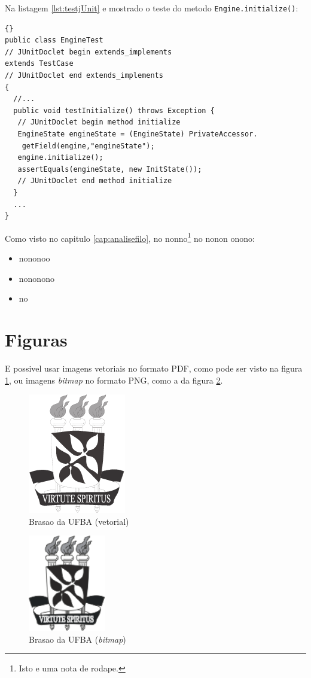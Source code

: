 Na listagem \ref{lst:testjUnit} 
e mostrado o teste do metodo \texttt{Engine.initialize()}:

\lstset{language=java}
\lstset{commentstyle=\textit}
\begin{lstlisting}[frame=trbl, caption=Classe Factory2D,label=lst:testjUnit]{}
public class EngineTest
// JUnitDoclet begin extends_implements
extends TestCase
// JUnitDoclet end extends_implements
{
  //...
  public void testInitialize() throws Exception {
   // JUnitDoclet begin method initialize
   EngineState engineState = (EngineState) PrivateAccessor.
    getField(engine,"engineState");
   engine.initialize();
   assertEquals(engineState, new InitState());
   // JUnitDoclet end method initialize
  }
  ...
}
\end{lstlisting}

Como visto no capitulo \ref{cap:analisefilo}, no nonno\footnote{Isto e uma nota
de rodape.} no nonon onono:
\begin{itemize}
  \item{nononoo}
  \item{nononono}
  \item{no}
\end{itemize}


\section{Figuras} \label{sec:figuras}

E possivel usar imagens vetoriais no \cite{andrade2006} formato PDF, como pode ser visto
na figura \ref{fig:ufba}, ou imagens \emph{bitmap} no formato PNG, como
a da figura \ref{fig:ufba2}.

\begin{figure}
\centering
\includegraphics{brasaoUFBA2}
\caption{Brasao da UFBA (vetorial)}
\label{fig:ufba}
\end{figure}

\begin{figure}
\centering
\includegraphics[width=0.3\textwidth]{brasaoUFBA}
\caption{Brasao da UFBA (\emph{bitmap})}
\label{fig:ufba2}
\end{figure}
